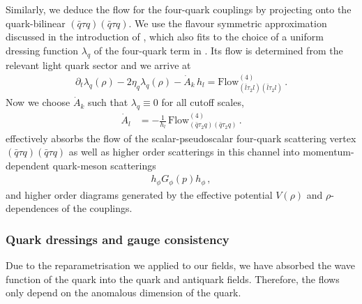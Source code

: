 \documentclass[aps,twocolumn,prd,superscriptaddress]{revtex4-2}
\begin{document}
Similarly, we deduce the flow for the four-quark couplings by projecting onto the quark-bilinear $(\bar q \tau q)(\bar q \tau q)$. We use the flavour symmetric approximation discussed in the introduction of , which also fits to the choice of a uniform dressing function $\lambda_q$ of the four-quark term in . Its flow is determined from the relevant light quark sector and we arrive at 
%
\begin{align}
	\partial_t \lambda_q (\rho) - 2 \eta_q \lambda_q (\rho) - \dot{A}_{k} \, h_l = {\textrm{Flow}}_{(\bar l\tau_2 l)(\bar l \tau_2 l)}^{(4)}\,. 
\end{align}
%
Now we choose $\dot A_k$ such that $\lambda_q \equiv 0$ for all cutoff scales, 
%
\begin{align}
	\dot{A}_l & =-\frac{1}{{h}_l}\,{
		\textrm{Flow}}^{(4)}_{(\bar q\tau_2 q)(\bar q\tau_2 q)} \,. 
	\label{eq:dotAChoice}
\end{align}
%
 effectively absorbs the flow of the scalar-pseudoscalar four-quark scattering vertex $(\bar q \tau q)(\bar q \tau q)$ as well as higher order scatterings in this channel into momentum-dependent quark-meson scatterings 
%
\begin{align}
h_\phi G_\phi(p) h_\phi\,,
\end{align} 
%
and higher order diagrams generated by the effective potential $V(\rho)$ and $\rho$-dependences of the couplings. 


\subsubsection{Quark dressings and gauge consistency}
\label{sec:QuarkZ}	

Due to the reparametrisation we applied to our fields, we have absorbed the wave function of the quark into the quark and antiquark fields. Therefore, the flows only depend on the anomalous dimension of the quark. 
\end{document}
